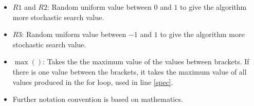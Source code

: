 \documentclass[runningheads]{llncs}
\begin{document}
\begin{itemize}
    \item $ R1 $ and $R2 $: Random uniform value between $ 0 $ and $ 1$ to give the algorithm more stochastic search value.
    \item $ R3 $: Random uniform value between $ -1 $ and $ 1$ to give the algorithm more stochastic search value.
    \item $ \max() $: Takes the the maximum value of the values between brackets. If there is one value between the brackets, it takes the maximum value of all values produced in the for loop, used in line \ref{spec}.
    \item Further notation convention is based on mathematics.
\end{itemize}



\end{document}
